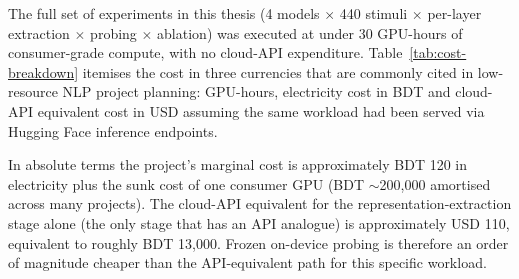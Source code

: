 The full set of experiments in this thesis (4 models $\times$ 440 stimuli $\times$ per-layer extraction $\times$ probing $\times$ ablation) was executed at under 30 GPU-hours of consumer-grade compute, with no cloud-API expenditure. Table~\ref{tab:cost-breakdown} itemises the cost in three currencies that are commonly cited in low-resource NLP project planning: GPU-hours, electricity cost in BDT and cloud-API equivalent cost in USD assuming the same workload had been served via Hugging Face inference endpoints.

\begin{table}[H]
\centering
\caption{Cost breakdown of the full DysLex-Probe pipeline. GPU-hours include representation extraction, probing, RSA and ablation across the four models. Electricity assumes 350~W average draw on a single consumer GPU at the Bangladesh residential rate of BDT 11.5/kWh. Cloud-API equivalent uses Hugging Face Inference Endpoints list pricing for comparable model classes.}
\label{tab:cost-breakdown}
\small
{}
\end{table}

In absolute terms the project's marginal cost is approximately BDT 120 in electricity plus the sunk cost of one consumer GPU (BDT $\sim$200{,}000 amortised across many projects). The cloud-API equivalent for the representation-extraction stage alone (the only stage that has an API analogue) is approximately USD 110, equivalent to roughly BDT 13{,}000. Frozen on-device probing is therefore an order of magnitude cheaper than the API-equivalent path for this specific workload.


